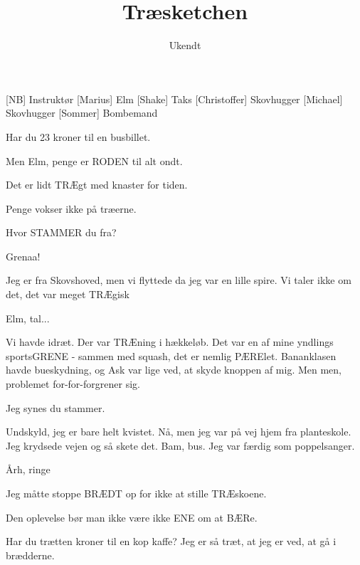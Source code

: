 \documentclass[a4paper,11pt]{article}
\title{Træsketchen}
\author{Ukendt}
\begin{document}
\maketitle

\begin{roles}
[NB] Instruktør
[Marius] Elm
[Shake] Taks
[Christoffer] Skovhugger
[Michael] Skovhugger
[Sommer] Bombemand
\end{roles}


\begin{sketch}

 Har du 23 kroner til en busbillet.

 Men Elm, penge er RODEN til alt ondt.

 Det er lidt TRÆgt med knaster for tiden.

 Penge vokser ikke på træerne.


 Hvor STAMMER du fra?

 Grenaa!

 Jeg er fra Skovshoved, men vi flyttede da jeg var en lille spire. Vi taler ikke om det, det var meget TRÆgisk

 Elm, tal...

 Vi havde idræt. Der var TRÆning i hækkeløb. Det var en af mine yndlings sportsGRENE - sammen med squash, det er nemlig PÆRElet. Bananklasen havde bueskydning, og Ask var lige ved, at skyde knoppen af mig. Men men, problemet for-for-forgrener sig.

 Jeg synes du stammer.

 Undskyld, jeg er bare helt kvistet. Nå, men jeg var på vej hjem fra planteskole. Jeg krydsede vejen og så skete det. Bam, bus. Jeg var færdig som poppelsanger.

 Årh, ringe

 Jeg måtte stoppe BRÆDT op for ikke at stille TRÆskoene.

 Den oplevelse bør man ikke være ikke ENE om at BÆRe.

 Har du trætten kroner til en kop kaffe? Jeg er så træt, at jeg er ved, at gå i brædderne.


\end{sketch}
\end{document}
